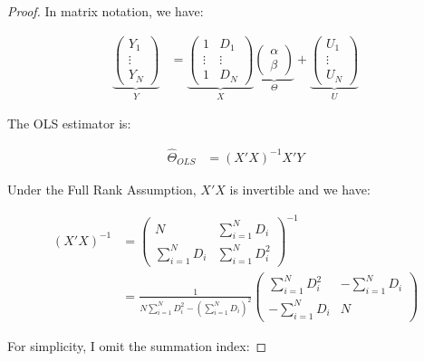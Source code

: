 \documentclass[
]{book}
\theoremstyle{definition}
\theoremstyle{definition}
\theoremstyle{definition}
\theoremstyle{definition}
\theoremstyle{remark}
\begin{document}
\begin{proof}
\iffalse{} {Proof. } \fi{}In matrix notation, we have:

\begin{align*}
  \underbrace{\left(\begin{array}{c}  Y_1 \\    \vdots \\   Y_N \end{array}\right)}_{Y} & = 
  \underbrace{\left(\begin{array}{cc}   1 & D_1\\   \vdots & \vdots\\   1 & D_N\end{array}\right)}_{X}
  \underbrace{\left(\begin{array}{c}    \alpha \\   \beta \end{array}\right)}_{\Theta}+
  \underbrace{\left(\begin{array}{c}    U_1 \\  \vdots \\   U_N \end{array}\right)}_{U}
\end{align*}

The OLS estimator is:

\begin{align*}
    \hat{\Theta}_{OLS} &  = (X'X)^{-1}X'Y
\end{align*}

Under the Full Rank Assumption, \(X'X\) is invertible and we have:

\begin{align*}
(X'X)^{-1} &  = \left(\begin{array}{cc} N & \sum_{i=1}^ND_i \\ \sum_{i=1}^ND_i & \sum_{i=1}^ND_i^2 \end{array}\right)^{-1} \\
                & = \frac{1}{N\sum_{i=1}^ND_i^2-\left(\sum_{i=1}^ND_i\right)^2}\left(\begin{array}{cc} \sum_{i=1}^ND_i^2 & -\sum_{i=1}^ND_i \\ -\sum_{i=1}^ND_i & N \end{array}\right)
\end{align*}

For simplicity, I omit the summation index:


\end{proof}
\end{document}
